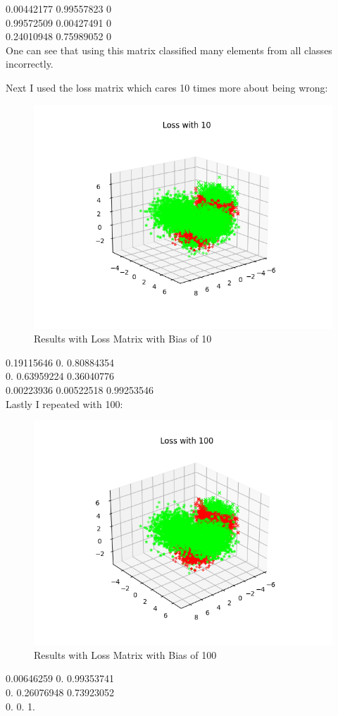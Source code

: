 \documentclass[11pt]{article}
\begin{document}
0.00442177  0.99557823  0\\
0.99572509  0.00427491  0\\
0.24010948  0.75989052  0\\

One can see that using this matrix classified many elements from all classes incorrectly.

Next I used the loss matrix which cares 10 times more about being wrong:

\begin{figure}[H]
	\centering
	\includegraphics[width=\textwidth]{3gloss10}
	\caption{Results with Loss Matrix with Bias of 10}
\end{figure}
0.19115646 0.         0.80884354\\
0.         0.63959224 0.36040776\\
0.00223936 0.00522518 0.99253546\\

Lastly I repeated with 100:
\begin{figure}[H]
	\centering
	\includegraphics[width=\textwidth]{3gloss100}
	\caption{Results with Loss Matrix with Bias of 100}
\end{figure}
0.00646259 0.         0.99353741\\
0.         0.26076948 0.73923052\\
0.         0.         1.        \\
\end{document}
